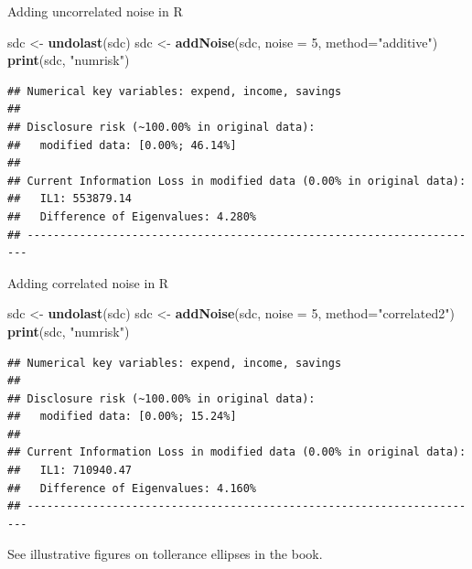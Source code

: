 \documentclass[ignorenonframetext,]{beamer}
\newenvironment{Shaded}{\begin{snugshade}}{\end{snugshade}}
\newcommand{\DataTypeTok}[1]{\textcolor[rgb]{0.13,0.29,0.53}{#1}}
\newcommand{\DecValTok}[1]{\textcolor[rgb]{0.00,0.00,0.81}{#1}}
\newcommand{\KeywordTok}[1]{\textcolor[rgb]{0.13,0.29,0.53}{\textbf{#1}}}
\newcommand{\NormalTok}[1]{#1}
\newcommand{\StringTok}[1]{\textcolor[rgb]{0.31,0.60,0.02}{#1}}
\begin{document}
\begin{frame}[fragile]{Adding uncorrelated noise in R}
\protect\hypertarget{adding-uncorrelated-noise-in-r}{}

\begin{Shaded}
\begin{Highlighting}[]
\NormalTok{sdc <-}\StringTok{ }\KeywordTok{undolast}\NormalTok{(sdc)}
\NormalTok{sdc <-}\StringTok{ }\KeywordTok{addNoise}\NormalTok{(sdc, }\DataTypeTok{noise =} \DecValTok{5}\NormalTok{, }\DataTypeTok{method=}\StringTok{"additive"}\NormalTok{)}
\KeywordTok{print}\NormalTok{(sdc, }\StringTok{"numrisk"}\NormalTok{)}
\end{Highlighting}
\end{Shaded}

\begin{verbatim}
## Numerical key variables: expend, income, savings
## 
## Disclosure risk (~100.00% in original data):
##   modified data: [0.00%; 46.14%]
## 
## Current Information Loss in modified data (0.00% in original data):
##   IL1: 553879.14
##   Difference of Eigenvalues: 4.280%
## ----------------------------------------------------------------------
\end{verbatim}

\end{frame}

\begin{frame}[fragile]{Adding correlated noise in R}
\protect\hypertarget{adding-correlated-noise-in-r}{}

\begin{Shaded}
\begin{Highlighting}[]
\NormalTok{sdc <-}\StringTok{ }\KeywordTok{undolast}\NormalTok{(sdc)}
\NormalTok{sdc <-}\StringTok{ }\KeywordTok{addNoise}\NormalTok{(sdc, }\DataTypeTok{noise =} \DecValTok{5}\NormalTok{, }\DataTypeTok{method=}\StringTok{"correlated2"}\NormalTok{)}
\KeywordTok{print}\NormalTok{(sdc, }\StringTok{"numrisk"}\NormalTok{)}
\end{Highlighting}
\end{Shaded}

\begin{verbatim}
## Numerical key variables: expend, income, savings
## 
## Disclosure risk (~100.00% in original data):
##   modified data: [0.00%; 15.24%]
## 
## Current Information Loss in modified data (0.00% in original data):
##   IL1: 710940.47
##   Difference of Eigenvalues: 4.160%
## ----------------------------------------------------------------------
\end{verbatim}

See illustrative figures on tollerance ellipses in the book.

\end{frame}
\end{document}
